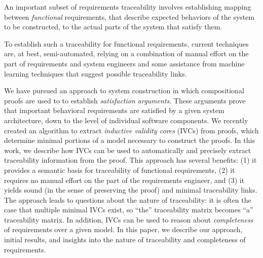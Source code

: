 An important subset of requirements traceability involves establishing  mapping between {\em functional} requirements, that describe expected behaviors of the system to be constructed, to the actual parts of the system that satisfy them.

To establish such a traceability for functional requirements, current techniques are, at best, semi-automated, relying on a combination of manual effort on the part of requirements and system engineers and some assistance from machine learning techniques that suggest possible traceability links.

We have pursued an approach to system construction in which compositional proofs are used to to establish {\em satisfaction arguments}.  These arguments prove that important behavioral requirements are satisfied by a given system architecture, down to the level of individual software components.  We recently created an algorithm to extract {\em inductive validity cores} (IVCs) from proofs, which determine minimal portions of a model necessary to construct the proofs.  In this work, we describe how IVCs can be used to automatically and precisely extract traceability information from the proof.  This approach has several benefits: (1) it provides a semantic basis for traceability of functional requirements, (2) it requires no manual effort on the part of the requirements engineer, and (3) it yields sound (in the sense of preserving the proof) and minimal traceability links.  The approach leads to questions about the nature of traceability: it is often the case that multiple minimal IVCs exist, so ``the'' traceability matrix becomes ``a'' traceability matrix.  In addition, IVCs can be used to reason about {\em completeness} of requirements over a given model.  In this paper, we describe our approach, initial results, and insights into the nature of traceability and completeness of requirements.

